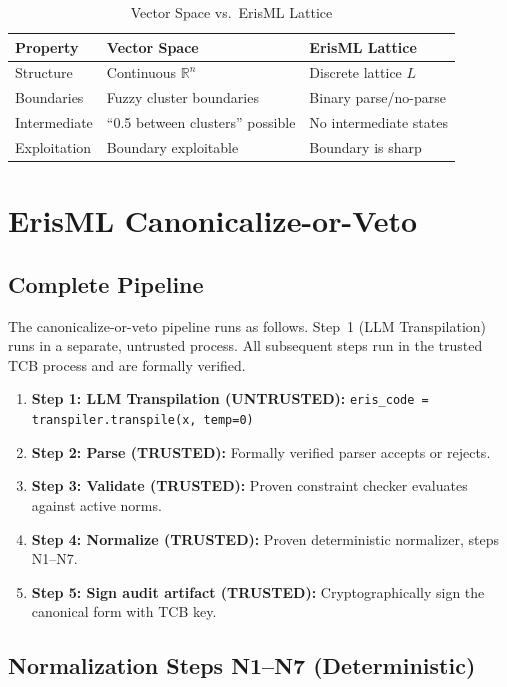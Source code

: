 \documentclass[11pt,letterpaper]{article}
\theoremstyle{definition}
\theoremstyle{remark}
\begin{document}
\begin{table}[h]
\centering
\begin{tabular}{@{}lll@{}}
\toprule
\textbf{Property} & \textbf{Vector Space} & \textbf{ErisML Lattice} \\
\midrule
Structure & Continuous $\mathbb{R}^n$ & Discrete lattice $L$ \\
Boundaries & Fuzzy cluster boundaries & Binary parse/no-parse \\
Intermediate & ``0.5 between clusters'' possible & No intermediate states \\
Exploitation & Boundary exploitable & Boundary is sharp \\
\bottomrule
\end{tabular}
\caption{Vector Space vs.\ ErisML Lattice}
\end{table}


\section{ErisML Canonicalize-or-Veto}

\subsection{Complete Pipeline}

The canonicalize-or-veto pipeline runs as follows. Step~1 (LLM Transpilation) runs in a separate, untrusted process. All subsequent steps run in the trusted TCB process and are formally verified.

\begin{enumerate}
\item \textbf{Step 1: LLM Transpilation (UNTRUSTED):} \texttt{eris\_code = transpiler.transpile(x, temp=0)}
\item \textbf{Step 2: Parse (TRUSTED):} Formally verified parser accepts or rejects.
\item \textbf{Step 3: Validate (TRUSTED):} Proven constraint checker evaluates against active norms.
\item \textbf{Step 4: Normalize (TRUSTED):} Proven deterministic normalizer, steps N1--N7.
\item \textbf{Step 5: Sign audit artifact (TRUSTED):} Cryptographically sign the canonical form with TCB key.
\end{enumerate}

\subsection{Normalization Steps N1--N7 (Deterministic)}
\end{document}
